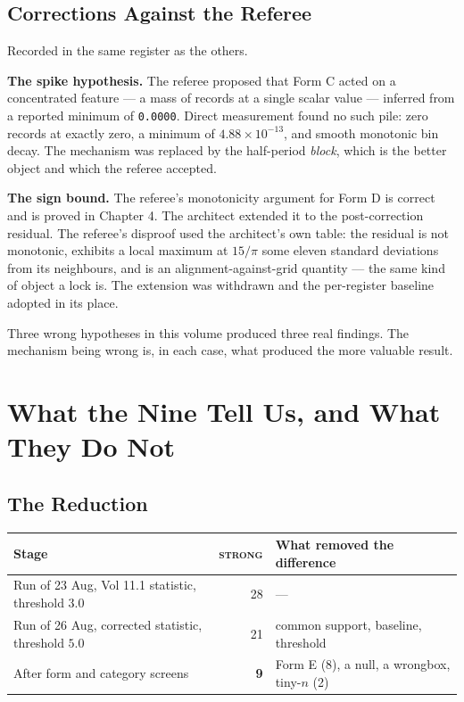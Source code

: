 \documentclass[11pt, letterpaper, openany]{book}
\begin{document}
\section{Corrections Against the Referee}

Recorded in the same register as the others.

\begin{correctionbox}
\textbf{The spike hypothesis.} The referee proposed that Form C acted on a concentrated feature
--- a mass of records at a single scalar value --- inferred from a reported minimum of
\texttt{0.0000}. Direct measurement found no such pile: zero records at exactly zero, a minimum
of $4.88\times10^{-13}$, and smooth monotonic bin decay. The mechanism was replaced by the
half-period \emph{block}, which is the better object and which the referee accepted.

\medskip
\textbf{The sign bound.} The referee's monotonicity argument for Form D is correct and is proved
in Chapter 4. The architect extended it to the post-correction residual. The referee's disproof
used the architect's own table: the residual is not monotonic, exhibits a local maximum at
$15/\pi$ some eleven standard deviations from its neighbours, and is an alignment-against-grid
quantity --- the same kind of object a lock is. The extension was withdrawn and the per-register
baseline adopted in its place.
\end{correctionbox}

\noindent Three wrong hypotheses in this volume produced three real findings. The mechanism
being wrong is, in each case, what produced the more valuable result.

\chapter{What the Nine Tell Us, and What They Do Not}

\section{The Reduction}

\begin{table}[H]
\centering
\small
\begin{tabular}{@{}lrl@{}}
\toprule
\textbf{Stage} & \textbf{\textsc{strong}} & \textbf{What removed the difference} \\
\midrule
Run of 23 Aug, Vol 11.1 statistic, threshold $3.0$ & 28 & --- \\
Run of 26 Aug, corrected statistic, threshold $5.0$ & 21 & common support, baseline, threshold \\
After form and category screens & \textbf{9} & Form E (8), a null, a wrongbox, tiny-$n$ (2) \\
\bottomrule
\end{tabular}
\end{table}
\end{document}
